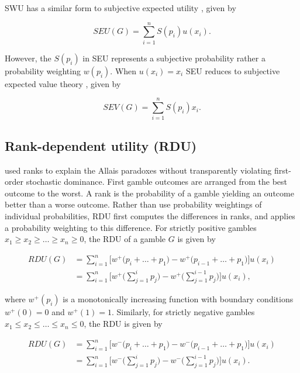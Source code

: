 \documentclass{article}\usepackage[]{graphicx}\usepackage[]{color}
\begin{document}
SWU has a similar form to subjective expected utility \cite{Savage_1954}, given by

\begin{equation}
SEU(G) = \sum_{i=1}^{n} S(p_i) u(x_i).
\label{seu_equation}
\end{equation}

However, the $S(p_i)$ in SEU represents a subjective probability rather a probability weighting $w(p_i)$.
When $u(x_i) = x_i$ SEU reduces to subjective expected value theory \citep*{Preston_Baratta_1948}, given by

\begin{equation}
SEV(G) = \sum_{i=1}^{n} S(p_i) x_i.
\label{sev_equation}
\end{equation}

\subsection{Rank-dependent utility (RDU)}

\cite{Quiggin_1982, Quiggin_1985, Quiggin_1993} used ranks to explain the Allais paradoxes without transparently violating first-order stochastic dominance. First gamble outcomes are arranged from the best outcome to the worst.
A rank is the probability of a gamble yielding an outcome better than a worse outcome. Rather than use probability weightings of individual probabilities, RDU first computes the differences in ranks, and applies a probability weighting to
this difference. For strictly positive gambles $x_1 \geq x_2 \geq \ldots \geq x_n \geq 0$, the RDU of a gamble $G$ is given by

\begin{equation}
\begin{split}
RDU(G) &= \sum_{i=1}^{n} \Bigg[ w^+\Bigg(p_i + \ldots + p_1\Bigg) - w^+\Bigg(p_{i-1} + \ldots + p_1\Bigg)\Bigg] u(x_i)\\
 &= \sum_{i=1}^{n} \Bigg[ w^+\Bigg(\sum_{j=1}^{i} p_j\Bigg) - w^+\Bigg(\sum_{j=1}^{i-1} p_j\Bigg)\Bigg] u(x_i),
\end{split}
\label{rdu_positive_equation}
\end{equation}

where $w^+(p_i)$ is a monotonically increasing function with boundary conditions $w^+(0) = 0$ and $w^+(1) = 1$.
Similarly, for strictly negative gambles $x_1 \leq x_2 \leq \ldots \leq x_n \leq 0$, the RDU is given by

\begin{equation}
\begin{split}
RDU(G) &= \sum_{i=1}^{n} \Bigg[ w^-\Bigg(p_i + \ldots + p_1\Bigg) - w^-\Bigg(p_{i-1} + \ldots + p_1\Bigg)\Bigg] u(x_i)\\
 &= \sum_{i=1}^{n} \Bigg[ w^-\Bigg(\sum_{j=1}^{i} p_j\Bigg) - w^-\Bigg(\sum_{j=1}^{i-1} p_j\Bigg)\Bigg] u(x_i).
\end{split}
\label{rdu_negative_equation}
\end{equation}
\end{document}
